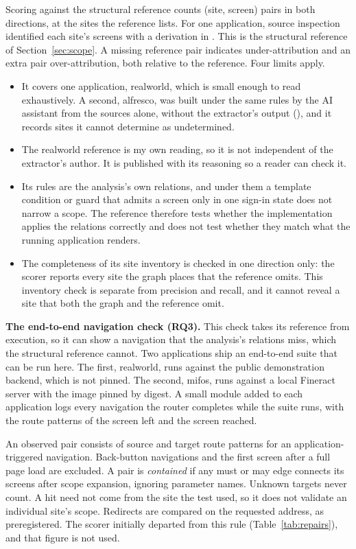 Scoring against the structural reference counts (site, screen) pairs in both directions, at the sites the reference lists. For one application, source inspection
identified each site's screens with a derivation in .
This is the structural reference of Section~\ref{sec:scope}. A missing
reference pair indicates under-attribution and an extra pair over-attribution, both relative to the reference. Four limits apply.
\begin{itemize}
\item It covers one application, realworld, which is small enough to read exhaustively. A second, alfresco, was built under the same rules by the AI assistant from the sources alone, without the extractor's output (), and it records sites it cannot determine as undetermined.
\item The realworld reference is my own reading, so it is not independent of the extractor's author. It is published with
its reasoning so a reader can check it.
\item Its rules are the analysis's own relations, and under them a template condition or guard that
admits a screen only in one sign-in state does not narrow a scope. The reference therefore tests
whether the implementation applies the relations correctly and does not test whether they match what
the running application renders.
\item The completeness of its site inventory is checked in one direction only: the scorer reports
every site the graph places that the reference omits. This inventory check is separate from
precision and recall, and it cannot reveal a site that both the graph and the reference omit.
\end{itemize}

\textbf{The end-to-end navigation check (RQ3).} This check takes its reference from execution, so it can show a navigation that the
analysis's relations miss, which the structural reference cannot. Two applications ship an end-to-end suite that can be run here.
The first, realworld, runs against the public demonstration backend, which is not pinned. The second, mifos, runs against a local
Fineract server with the image pinned by digest. A small module added to each application logs
every navigation the router completes while the suite runs, with the route patterns of the screen
left and the screen reached.

An observed pair consists of source and target route patterns for an application-triggered
navigation. Back-button navigations and the first screen after a full page load are excluded.
A pair is \emph{contained} if any must or may edge connects its screens after scope expansion,
ignoring parameter names. Unknown targets never count. A hit need not come from the site the test
used, so it does not validate an individual site's scope. Redirects are compared on the requested
address, as preregistered. The scorer initially departed from this rule
(Table~\ref{tab:repairs}), and that figure is not used.


